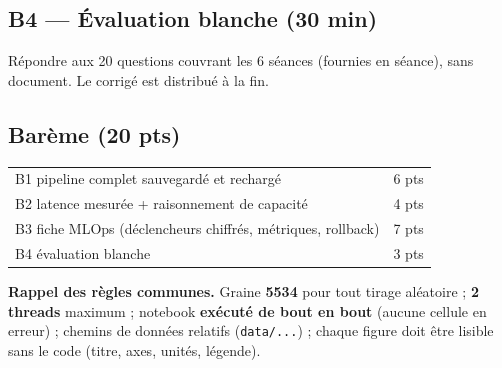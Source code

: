 \documentclass[11pt,a4paper]{article}
\newcommand{\file}[1]{\texttt{\small #1}}
\begin{document}
\subsection*{B4 --- Évaluation blanche (30 min)}
Répondre aux 20 questions couvrant les 6 séances (fournies en séance), sans
document. Le corrigé est distribué à la fin.

\subsection*{Barème (20 pts)}
\begin{center}\small
\begin{tabular}{@{}p{11.2cm}c@{}}
\toprule
B1 pipeline complet sauvegardé et rechargé & 6 pts\\
B2 latence mesurée + raisonnement de capacité & 4 pts\\
B3 fiche MLOps (déclencheurs chiffrés, métriques, rollback) & 7 pts\\
B4 évaluation blanche & 3 pts\\
\bottomrule
\end{tabular}
\end{center}

\vspace{6mm}
\begin{garde}
\textbf{Rappel des règles communes.} Graine \textbf{5534} pour tout tirage
aléatoire ; \textbf{2 threads} maximum ; notebook \textbf{exécuté de bout en
bout} (aucune cellule en erreur) ; chemins de données relatifs
(\file{data/...}) ; chaque figure doit être lisible sans le code
(titre, axes, unités, légende).
\end{garde}
\end{document}
